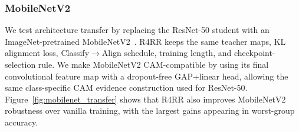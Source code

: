 \subsubsection{MobileNetV2}






We test architecture transfer by replacing the ResNet-50 student with an ImageNet-pretrained MobileNetV2~\cite{sandler2018mobilenetv2}. R4RR keeps the same teacher maps, KL alignment loss, Classify$\rightarrow$Align schedule, training length, and checkpoint-selection rule. We make MobileNetV2 CAM-compatible by using its final convolutional feature map with a dropout-free GAP+linear head, allowing the same class-specific CAM evidence construction used for ResNet-50. Figure~\ref{fig:mobilenet_transfer} shows that R4RR also improves MobileNetV2 robustness over vanilla training, with the largest gains appearing in worst-group accuracy.

